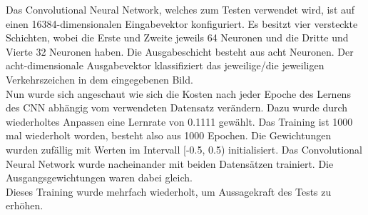 \documentclass[paper=A4,pagesize=auto,12pt,headinclude=true,footinclude=true,BCOR=0mm,DIV=calc]{scrartcl}
\begin{document}
Das Convolutional Neural Network, welches zum Testen verwendet wird, ist auf einen 16384-dimensionalen Eingabevektor konfiguriert. Es besitzt vier versteckte Schichten, wobei die Erste und Zweite jeweils 64 Neuronen und die Dritte und Vierte 32 Neuronen haben. Die Ausgabeschicht besteht aus acht Neuronen. Der acht-dimensionale Ausgabevektor klassifiziert das jeweilige/die jeweiligen Verkehrszeichen in dem eingegebenen Bild.\\
Nun wurde sich angeschaut wie sich die Kosten nach jeder Epoche des Lernens des CNN abhängig vom verwendeten Datensatz verändern. Dazu wurde durch wiederholtes Anpassen eine Lernrate von 0.1111 gewählt. Das Training ist 1000 mal wiederholt worden, besteht also aus 1000 Epochen. Die Gewichtungen wurden zufällig mit Werten im Intervall [-0.5, 0.5) initialisiert. Das Convolutional Neural Network wurde nacheinander mit beiden Datensätzen trainiert. Die Ausgangsgewichtungen waren dabei gleich.\\
Dieses Training wurde mehrfach wiederholt, um Aussagekraft des Tests zu erhöhen.
\end{document}
